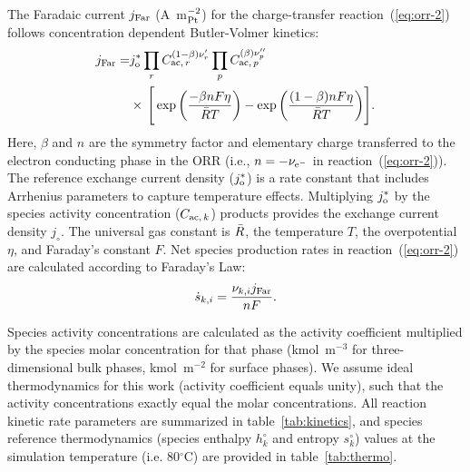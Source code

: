 \documentclass[final,3p,times,twocolumn]{elsarticle}    %
\begin{document}
The Faradaic current $j_{\rm Far}$ (A~m$^{-2}_{\rm Pt}$) for the charge-transfer reaction~(\ref{eq:orr-2}) follows concentration dependent Butler-Volmer kinetics:
\begin{equation}
\begin{split}
    j_{\rm Far} = & j_{\rm o}^{*} 
    \prod_{r} C_{{\rm ac},\,r}^{(1-\beta)\nu_{r}^{\prime}} 
    \prod_{p} C_{{\rm ac},\,p}^{(\beta)\nu_{p}^{\prime \prime}} \\
    & \times \, \Bigg[ \exp \bigg( \frac{-\beta n F \eta}{\Bar{R} T} \bigg) 
        - \exp \bigg( \frac{(1-\beta) n F \eta}{\Bar{R} T} \bigg) \Bigg].
\end{split}
\end{equation}
Here, $\beta$ and $n$ are the symmetry factor and elementary charge transferred to the electron conducting phase in the ORR (i.e., $n = -\nu_{\rm e^{-}}$ in reaction~(\ref{eq:orr-2})). The reference exchange current density ($j_{\rm o}^{*}$) is a rate constant that includes Arrhenius parameters to capture temperature effects. Multiplying $j_{\rm o}^{*}$ by the species activity concentration ($C_{{\rm ac},\,k}$) products provides the exchange current density $j_\circ$. The universal gas constant is $\Bar{R}$, the temperature $T$, the overpotential $\eta$, and Faraday's constant $F$. Net species production rates in reaction~(\ref{eq:orr-2}) are calculated according to Faraday's Law:
\begin{equation}
    \dot{s}_{k,i} = \frac{\nu_{k,i} j_{\rm Far}}{n F}.
\end{equation}

Species activity concentrations are calculated as the activity coefficient multiplied by the species molar concentration for that phase (kmol~m$^{-3}$ for three-dimensional bulk phases, kmol~m$^{-2}$ for surface phases). We assume ideal thermodynamics for this work (activity coefficient equals unity), such that the activity concentrations exactly equal the molar concentrations. All reaction kinetic rate parameters are summarized in table~\ref{tab:kinetics}, and species reference thermodynamics (species enthalpy $h_k^\circ$ and entropy $s_k^\circ$) values at the simulation temperature (i.e. 80$^{\circ}$C) are provided in table~\ref{tab:thermo}.
\end{document}
